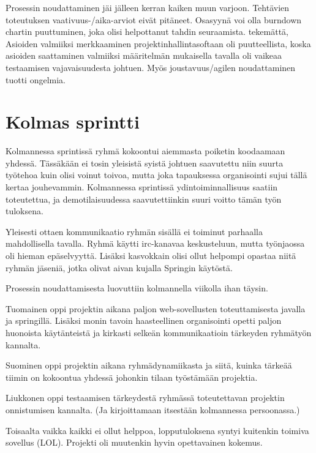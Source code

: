 \documentclass[10pt,a4paper]{article}
\begin{document}
Prosessin noudattaminen jäi jälleen kerran kaiken muun varjoon. Tehtävien
toteutuksen vaativuus-/aika-arviot eivät pitäneet. Osasyynä voi olla
burndown chartin puuttuminen, joka olisi helpottanut tahdin seuraamista.
tekemättä, Asioiden valmiiksi
merkkaaminen projektinhallintasoftaan oli puutteellista, koska asioiden
saattaminen valmiiksi määritelmän mukaisella tavalla oli vaikeaa
testaamisen vajavaisuudesta johtuen. Myös joustavuus/agilen noudattaminen
tuotti ongelmia. 

\section*{Kolmas sprintti}
Kolmannessa sprintissä ryhmä kokoontui aiemmasta poiketin koodaamaan
yhdessä. Tässäkään ei tosin yleisistä syistä johtuen saavutettu
niin suurta työtehoa kuin olisi voinut toivoa, mutta joka tapauksessa
organisointi sujui tällä kertaa jouhevammin. Kolmannessa sprintissä
ydintoiminnallisuus saatiin toteutettua, ja demotilaisuudessa
saavutettiinkin suuri voitto tämän työn tuloksena.

Yleisesti ottaen kommunikaatio ryhmän sisällä ei toiminut parhaalla
mahdollisella tavalla. Ryhmä käytti irc-kanavaa keskusteluun, mutta
työnjaossa oli hieman epäselvyyttä. Lisäksi kasvokkain olisi ollut
helpompi opastaa niitä ryhmän jäseniä, jotka olivat aivan kujalla
Springin käytöstä.

Prosessin noudattamisesta luovuttiin kolmannella viikolla ihan täysin.

Tuomainen oppi projektin aikana paljon web-sovellusten toteuttamisesta
javalla ja springillä. Lisäksi monin tavoin haasteellinen organisointi
opetti paljon huonoista käytänteistä ja kirkasti selkeän
kommunikaatioin tärkeyden ryhmätyön kannalta.

Suominen oppi projektin aikana ryhmädynamiikasta ja siitä, kuinka
tärkeää tiimin on kokoontua yhdessä johonkin tilaan työstämään
projektia.

Liukkonen oppi testaamisen tärkeydestä ryhmässä toteutettavan projektin
onnistumisen kannalta. (Ja kirjoittamaan itsestään kolmannessa persoonassa.)

Toisaalta vaikka kaikki ei ollut helppoa, lopputuloksena syntyi kuitenkin
toimiva sovellus (LOL). Projekti oli muutenkin hyvin opettavainen kokemus.
\end{document}
